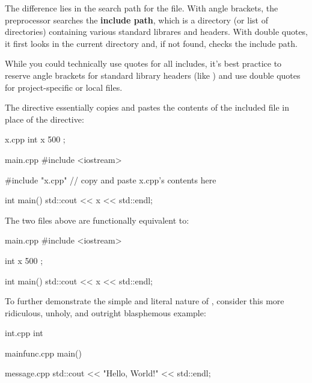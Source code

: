 \documentclass[12pt]{article}
\begin{document}
\noindent
The difference lies in the search path for the file.
With angle brackets, the preprocessor searches the \textbf{include path}, which is a directory (or list of directories) containing various standard librares and headers.
With double quotes, it first looks in the current directory and, if not found, checks the include path.

\begin{advice}
While you could technically use quotes for all includes, it's best practice to reserve angle brackets for standard library headers (like ) and use double quotes for project-specific or local files.
\end{advice}

\noindent
The  directive essentially copies and pastes the contents of the included file in place of the directive:

\begin{cxx}{x.cpp}
int x { 500 };
\end{cxx}

\begin{cxx}{main.cpp}
#include <iostream>

#include "x.cpp" // copy and paste x.cpp's contents here

int main()
{
	std::cout << x << std::endl;
}
\end{cxx}

\noindent
The two files above are functionally equivalent to:

\begin{cxx}{main.cpp}
#include <iostream>

int x { 500 };

int main()
{
	std::cout << x << std::endl;
}
\end{cxx}

\noindent
To further demonstrate the simple and literal nature of , consider this more ridiculous, unholy, and outright blasphemous example:

\begin{cxx}{int.cpp}
int
\end{cxx}

\begin{cxx}{mainfunc.cpp}
main()
\end{cxx}

\begin{cxx}{openbrace.cpp}
{
\end{cxx}

\begin{cxx}{message.cpp}
std::cout << "Hello, World!" << std::endl;
\end{cxx}
\end{document}
